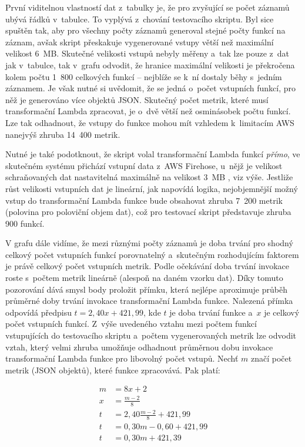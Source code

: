 \documentclass[czech, ing, kiv, he, iso690]{fasthesis}
\begin{document}
\label{lab:bench-input-size}
První viditelnou vlastností dat z~tabulky je, že pro zvyšující se počet záznamů ubývá řádků v~tabulce. To vyplývá z~chování testovacího skriptu. Byl sice spuštěn tak, aby pro všechny počty záznamů generoval stejné počty funkcí na záznam, avšak skript přeskakuje vygenerované vstupy větší než maximální velikost 6~MB. Skutečné velikosti vstupů nebyly měřeny a~tak lze pouze z~dat jak v~tabulce, tak v~grafu odvodit, že hranice maximální velikosti je překročena kolem počtu 1~800 celkových funkcí -- nejblíže se k~ní dostaly běhy s~jedním záznamem. Je však nutné si uvědomit, že se jedná o~počet vstupních funkcí, pro něž je generováno více objektů JSON. Skutečný počet metrik, které musí transformační Lambda zpracovat, je o~dvě větší než osminásobek počtu funkcí. Lze tak odhadnout, že vstupy do funkce mohou mít vzhledem k~limitacím AWS nanejvýš zhruba 14~400 metrik. 

Nutné je také podotknout, že skript volal transformační Lambda funkcí \emph{přímo}, ve skutečném systému přichází vstupní data z~AWS Firehose, u~nějž je velikost schraňovaných dat nastavitelná maximálně na velikost 3~MB \cite{firehose.docs.aws}, viz výše. Jestliže růst velikosti vstupních dat je lineární, jak napovídá logika, nejobjemnější možný vstup do transformační Lambda funkce bude obsahovat zhruba 7~200 metrik (polovina pro poloviční objem dat), což pro testovací skript představuje zhruba 900 funkcí.

V grafu dále vidíme, že mezi různými počty záznamů je doba trvání pro shodný celkový počet vstupních funkcí porovnatelný a~skutečným rozhodujícím faktorem je právě celkový počet vstupních metrik. Podle očekávání doba trvání invokace roste s~počtem metrik lineárně (alespoň na daném vzorku dat). Díky tomuto pozorování dává smysl body proložit přímku, která nejlépe aproximuje průběh průměrné doby trvání invokace transformační Lambda funkce. Nalezená přímka odpovídá předpisu $t = 2,40x + 421,99$, kde $t$ je doba trvání funkce a~$x$ je celkový počet vstupních funkcí. Z~výše uvedeného vztahu mezi počtem funkcí vstupujících do testovacího skriptu a~počtem vygenerovaných metrik lze odvodit vztah, který velmi zhruba umožňuje odhadnout průměrnou dobu invokace transformační Lambda funkce pro libovolný počet vstupů. Nechť $m$ značí počet metrik (JSON objektů), které funkce zpracovává. Pak platí:

\begin{equation}
\begin{split}
    m& = 8x + 2 \\
    x& = \frac{m-2}{8} \\
    t& = 2,40\frac{m-2}{8} + 421,99 \\
    t& = 0,30m - 0,60 + 421,99 \\
    t& = 0,30m + 421,39 \\
\end{split}
\end{equation}
\end{document}

